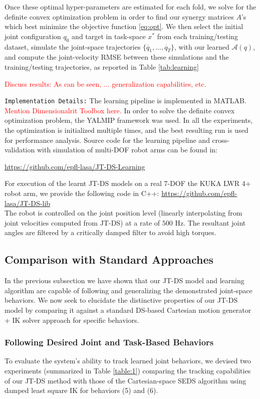 \documentclass[letterpaper, 10 pt, conference,fleqn]{ieeeconf}
\begin{document}
Once these optimal hyper-parameters are estimated for each fold, we solve for the definite convex optimization problem in order to find our synergy matrices $A$'s which best minimize the objective function \eqref{eq:opt}. We then select the initial joint configuration $q_0$ and target in task-space $x^*$ from each training/testing dataset, simulate the joint-space trajectories $\{\dot{q_1},\dots,\dot{q_T}\}$, with our learned $\mathcal{A}(q)$, and compute the joint-velocity RMSE between these simulations and the training/testing trajectories, as reported in Table \ref{tab:learning} 

\textcolor{red}{Discuss results: As can be seen,  ... generalization capabilities, etc.} 

\noindent\texttt{Implementation Details:} The learning pipeline is implemented in MATLAB. \textcolor{red}{Mention Dimensionalrit Toolbox here.} In order to solve the definite convex optimization problem, the YALMIP framework \cite{lofberg2004yalmip} was used. In all the experiments, the optimization is initialized multiple times, and the best resulting run is used for performance analysis. Source code for the learning pipeline and cross-validation with simulation of multi-DOF robot arms can be found in:
\footnotesize  \centerline{\underline{\url{https://github.com/epfl-lasa/JT-DS-Learning}}}
\normalsize

For execution of the learnt JT-DS models on a real 7-DOF the KUKA LWR 4+ robot arm, we provide the following code in C++:
\footnotesize \underline{\url{https://github.com/epfl-lasa/JT-DS-lib}}\\
\normalsize
The robot is controlled on the joint position level (linearly interpolating from joint velocities computed from JT-DS) at a rate of $ 500 $ Hz. The resultant joint angles are filtered by a critically damped filter to avoid high torques.


\newpage
\subsection{Comparison with Standard Approaches}
In the previous subsection we have shown that our JT-DS model and learning algorithm are capable of following and generalizing the demonstrated joint-space behaviors. We now seek to elucidate the distinctive properties of our JT-DS model by comparing it against a standard DS-based Cartesian motion generator + IK solver approach for specific behaviors.

\subsubsection{Following Desired Joint and Task-Based Behaviors}
To evaluate the system's ability to track learned joint behaviors, we devised two experiments (summarized in Table \ref{table:1}) comparing the tracking capabilities of our JT-DS method with those of the Cartesian-space SEDS \cite{khansari2011learning} algorithm using damped least square IK for behaviors (5) and (6).
\end{document}
